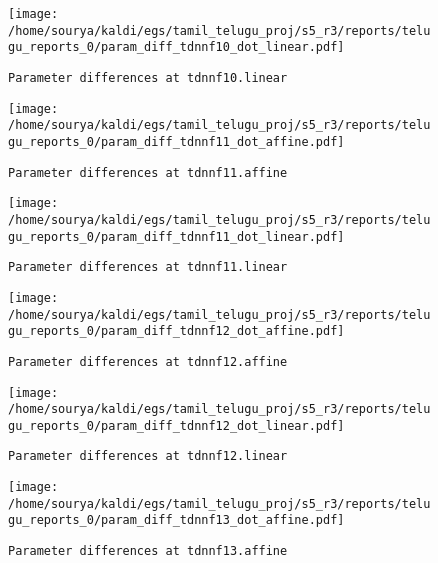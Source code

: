 \documentclass[prl,10pt,twocolumn]{revtex4}
\begin{document}
\newpage
\begin{figure}[h]
  \begin{center}
    \caption{\texttt{Parameter differences at tdnnf10.linear}}
    \texttt{[image: /home/sourya/kaldi/egs/tamil\_telugu\_proj/s5\_r3/reports/telugu\_reports\_0/param\_diff\_tdnnf10\_dot\_linear.pdf]}
  \end{center}
\end{figure}
\clearpage


\newpage
\begin{figure}[h]
  \begin{center}
    \caption{\texttt{Parameter differences at tdnnf11.affine}}
    \texttt{[image: /home/sourya/kaldi/egs/tamil\_telugu\_proj/s5\_r3/reports/telugu\_reports\_0/param\_diff\_tdnnf11\_dot\_affine.pdf]}
  \end{center}
\end{figure}
\clearpage


\newpage
\begin{figure}[h]
  \begin{center}
    \caption{\texttt{Parameter differences at tdnnf11.linear}}
    \texttt{[image: /home/sourya/kaldi/egs/tamil\_telugu\_proj/s5\_r3/reports/telugu\_reports\_0/param\_diff\_tdnnf11\_dot\_linear.pdf]}
  \end{center}
\end{figure}
\clearpage


\newpage
\begin{figure}[h]
  \begin{center}
    \caption{\texttt{Parameter differences at tdnnf12.affine}}
    \texttt{[image: /home/sourya/kaldi/egs/tamil\_telugu\_proj/s5\_r3/reports/telugu\_reports\_0/param\_diff\_tdnnf12\_dot\_affine.pdf]}
  \end{center}
\end{figure}
\clearpage


\newpage
\begin{figure}[h]
  \begin{center}
    \caption{\texttt{Parameter differences at tdnnf12.linear}}
    \texttt{[image: /home/sourya/kaldi/egs/tamil\_telugu\_proj/s5\_r3/reports/telugu\_reports\_0/param\_diff\_tdnnf12\_dot\_linear.pdf]}
  \end{center}
\end{figure}
\clearpage


\newpage
\begin{figure}[h]
  \begin{center}
    \caption{\texttt{Parameter differences at tdnnf13.affine}}
    \texttt{[image: /home/sourya/kaldi/egs/tamil\_telugu\_proj/s5\_r3/reports/telugu\_reports\_0/param\_diff\_tdnnf13\_dot\_affine.pdf]}
  \end{center}
\end{figure}
\clearpage
\end{document}
